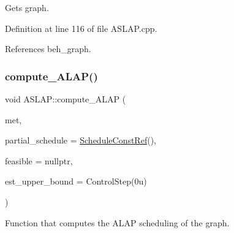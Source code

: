 Gets graph. 



Definition at line 116 of file A\+S\+L\+A\+P.\+cpp.



References beh\+\_\+graph.

\mbox{\label{classASLAP_a5668d3b6ee0112bd3881444a684c8c2f}} 
\subsubsection{\texorpdfstring{compute\+\_\+\+A\+L\+A\+P()}{compute\_ALAP()}}
{\footnotesize\ttfamily void A\+S\+L\+A\+P\+::compute\+\_\+\+A\+L\+AP (\begin{DoxyParamCaption}\item[{\hyperlink{classASLAP_a091a7ef2aa403de3cabf4275cd1eb211}{A\+L\+A\+P\+\_\+method}}]{met,  }\item[{const \hyperlink{schedule_8hpp_a85e4dea8a1611026193d8ca13fc5a260}{Schedule\+Const\+Ref}}]{partial\+\_\+schedule = {\ttfamily \hyperlink{schedule_8hpp_a85e4dea8a1611026193d8ca13fc5a260}{Schedule\+Const\+Ref}()},  }\item[{bool $\ast$}]{feasible = {\ttfamily nullptr},  }\item[{const Control\+Step}]{est\+\_\+upper\+\_\+bound = {\ttfamily ControlStep(0u)} }\end{DoxyParamCaption})}



Function that computes the A\+L\+AP scheduling of the graph. 


